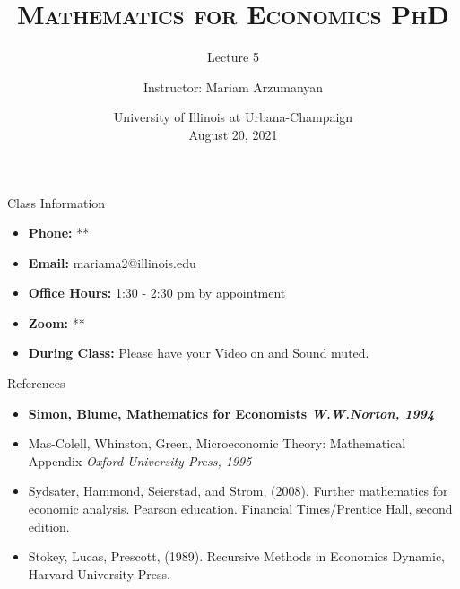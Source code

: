 \documentclass{beamer}
\title{\textsc{Mathematics for Economics PhD}}
\subtitle{Lecture 5}
\author{Instructor:  Mariam Arzumanyan}
\date[UIUC, Fall 2021]{University of Illinois at Urbana-Champaign \\August 20, 2021 }
\begin{document}
\begin{frame}
  \titlepage
\end{frame}


\begin{frame}{Class Information}
\begin{itemize}
  
    \item \textbf{Phone:} **
    \item \textbf{Email:} mariama2@illinois.edu
\item \textbf{Office Hours:}  1:30 - 2:30 pm  by appointment
\item \textbf{Zoom: }**
\item \textbf{During Class:} Please have your Video on and Sound muted. 

\end{itemize}

\end{frame}
\begin{frame}{References}
	\begin{itemize}

\item	\textbf{Simon, Blume, Mathematics for Economists \textit{W.W.Norton, 1994}}
\item	Mas-Colell, Whinston, Green, Microeconomic Theory: Mathematical Appendix \textit{Oxford University Press,  1995 }
\item		Sydsater, Hammond, Seierstad, and Strom, (2008). Further mathematics for economic analysis. Pearson education. Financial Times/Prentice Hall, second edition.
\item		Stokey, Lucas, Prescott, (1989). Recursive Methods in Economics Dynamic, Harvard University Press.

 \end{itemize}   
\end{frame}
\end{document}
